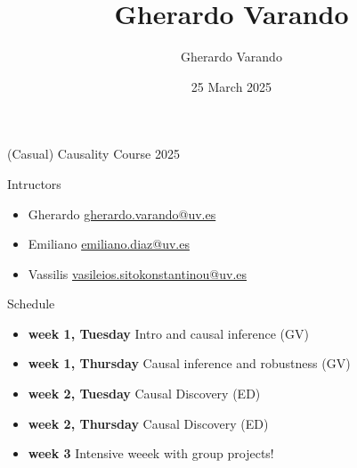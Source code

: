 \documentclass{beamer}
\institute[]{}
\title{Gherardo Varando}
\author{Gherardo Varando}
\date{25 March 2025}
\begin{document}
\begin{frame}{(Casual) Causality Course 2025}

	\begin{block}{Intructors}
	  \begin{itemize}
	    \item Gherardo \url{gherardo.varando@uv.es}
	    \item Emiliano \url{emiliano.diaz@uv.es} 
	    \item Vassilis \url{vasileios.sitokonstantinou@uv.es}
	  \end{itemize}
	\end{block}
	
	\begin{block}{Schedule} 
         \begin{itemize}
	   \item \textbf{week 1, Tuesday} Intro and causal inference (GV)
	   \item \textbf{week 1, Thursday} Causal inference and robustness (GV)    
	   \item \textbf{week 2, Tuesday} Causal Discovery (ED)
	   \item \textbf{week 2, Thursday} Causal Discovery (ED)
	   \item \textbf{week 3} Intensive weeek with group projects! 
	 \end{itemize}
	\end{block}


\end{frame}
\end{document}
